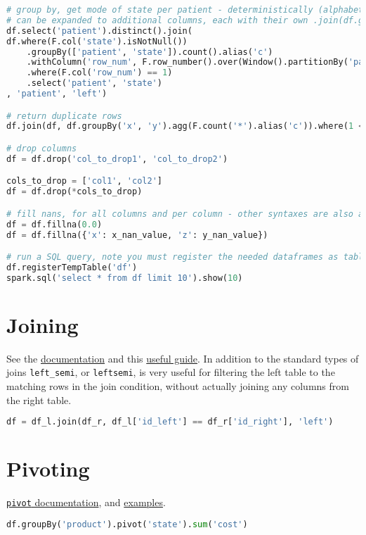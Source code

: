 \begin{lstlisting}[language=Python]
# group by, get mode of state per patient - deterministically (alphabetical order)
# can be expanded to additional columns, each with their own .join(df.groupBy()...) statements
df.select('patient').distinct().join(
df.where(F.col('state').isNotNull())
	.groupBy(['patient', 'state']).count().alias('c')
	.withColumn('row_num', F.row_number().over(Window().partitionBy('patient').orderBy(F.col('c').desc(), F.col('state'))))
	.where(F.col('row_num') == 1)
	.select('patient', 'state')
, 'patient', 'left')

# return duplicate rows
df.join(df, df.groupBy('x', 'y').agg(F.count('*').alias('c')).where(1 < F.('c')), ['x', 'y'], 'left_semi')

# drop columns
df = df.drop('col_to_drop1', 'col_to_drop2')

cols_to_drop = ['col1', 'col2']
df = df.drop(*cols_to_drop)

# fill nans, for all columns and per column - other syntaxes are also available
df = df.fillna(0.0)
df = df.fillna({'x': x_nan_value, 'z': y_nan_value})

# run a SQL query, note you must register the needed dataframes as tables first
df.registerTempTable('df')
spark.sql('select * from df limit 10').show(10)
\end{lstlisting}

\section{Joining}
\label{pyspark:join}

\noindent See the
\href{https://spark.apache.org/docs/latest/api/python/reference/api/pyspark.sql.DataFrame.join.html#pyspark-sql-dataframe-join}{documentation}
and this
\href{http://www.learnbymarketing.com/1100/pyspark-joins-by-example/}{useful guide}.
In addition to the standard types of joins \texttt{left\_semi}, or \texttt{leftsemi},
is very useful for filtering the left table to the matching rows in the join condition,
without actually joining any columns from the right table.

\begin{lstlisting}[language=Python]
df = df_l.join(df_r, df_l['id_left'] == df_r['id_right'], 'left')
\end{lstlisting}

\section{Pivoting}
\label{pyspark:pivoting}

\noindent \href{https://spark.apache.org/docs/latest/api/python/reference/api/pyspark.sql.GroupedData.pivot.html#pyspark-sql-groupeddata-pivot}{\texttt{pivot} documentation},
and
\href{https://sparkbyexamples.com/pyspark/pyspark-pivot-and-unpivot-dataframe/}{examples}.

\begin{lstlisting}[language=Python]
df.groupBy('product').pivot('state').sum('cost')
\end{lstlisting}
